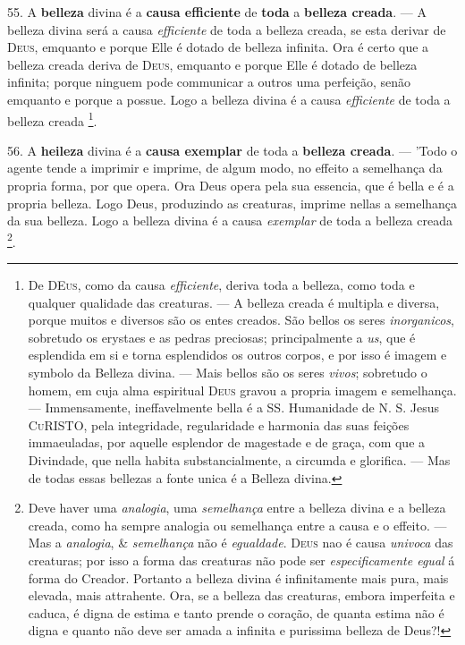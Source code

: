 55. A \textbf{belleza} divina é a \textbf{causa efficiente} de \textbf{toda} a \textbf{belleza creada}. --- A belleza divina será a causa \emph{efficiente} de toda a belleza creada, se esta derivar de \textsc{Deus}, emquanto e porque Elle é dotado de belleza infinita. Ora é certo que a belleza creada deriva de \textsc{Deus}, emquanto e porque Elle é dotado de belleza infinita; porque ninguem pode communicar a outros uma   perfeição, senão emquanto e porque a possue. Logo a belleza divina é a causa \emph{efficiente} de toda a belleza creada \footnote{De \textsc{DEus}, como da causa \emph{efficiente}, deriva toda a belleza, como toda e qualquer qualidade das creaturas. --- A belleza creada é multipla e diversa, porque muitos e diversos são os entes creados. São bellos os seres \emph{inorganicos}, sobretudo os erystaes e as pedras preciosas; principalmente a \emph{us}, que é esplendida em si e torna esplendidos os outros corpos, e por isso é imagem e symbolo da Belleza divina. --- Mais bellos são os seres \emph{vivos}; sobretudo o homem, em cuja alma espiritual \textsc{Deus} gravou a propria imagem e semelhança. --- Immensamente, ineffavelmente bella é a SS. Humanidade de N. S. Jesus \textsc{CuRISTO}, pela integridade, regularidade e harmonia das suas feições immaeuladas, por aquelle esplendor de magestade e de graça, com que a Divindade, que nella habita substancialmente, a circumda e glorifica. --- Mas de todas essas bellezas a fonte unica é a Belleza divina.}.

56. A \textbf{heileza} divina é a \textbf{causa exemplar} de toda a \textbf{belleza creada}. --- 'Todo o agente tende a imprimir e imprime, de algum modo, no effeito a semelhança da propria forma, por que opera. Ora Deus opera pela sua essencia, que é bella e é a propria belleza. Logo Deus, produzindo as creaturas, imprime nellas a semelhança da sua belleza. Logo a belleza divina é a causa \emph{exemplar} de toda a belleza creada \footnote{Deve haver uma \emph{analogia}, uma \emph{semelhança} entre a belleza divina e a belleza creada, como ha sempre analogia ou semelhança entre a causa e o effeito. --- Mas a \emph{analogia}, \& \emph{semelhança} não é \emph{egualdade}. \textsc{Deus} nao é causa \emph{univoca} das creaturas; por isso a forma das creaturas não pode ser \emph{especificamente egual} á forma do Creador. Portanto a belleza divina é infinitamente mais pura, mais elevada, mais attrahente. Ora, se a belleza das creaturas, embora imperfeita e caduca, é digna de estima e tanto prende o coração, de quanta estima não é digna e quanto não deve ser amada a infinita e purissima belleza de Deus?!}.

